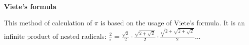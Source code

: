 \documentclass[22pt]{article}
\begin{document}
\begin{titlepage}
\begin{center}
	\LARGE\textbf{Viete's formula}
\end{center}
\normalsize
This method of calculation of $\pi$ is based on the usage of Viete's formula. It is an infinite product of nested radicals:
$
\frac{2}{\pi}=\frac{\sqrt{2}}{2}\cdot\frac{\sqrt{2+\sqrt{2}}}{2}\cdot\frac{\sqrt{2+\sqrt{2+\sqrt{2}}}}{2}\ldots
$
\end{titlepage}
\end{document}
